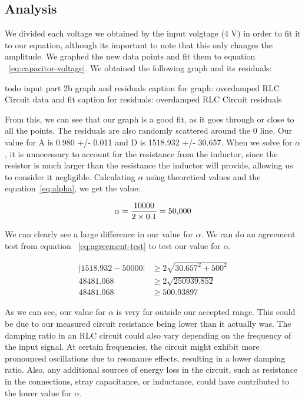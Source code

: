 \documentclass[11pt]{article}
\begin{document}
    \subsection{Analysis}\label{subsec:part2b_analysis}
    We divided each voltage we obtained by the input volgtage (4 V) in
    order to fit it to our equation, although its important to note that
    this only changes the amplitude. We graphed the new data points and fit
    them to equation ~\ref{eq:capacitor-voltage}. We obtained the following
    graph and its residuals:

    todo input part 2b graph and residuals
    caption for graph: overdamped RLC Circuit data and fit
    caption for residuals: overdamped RLC Circuit residuals

    From this, we can see that our graph is a good fit, as it goes through or close to all the points. The residuals are also randomly scattered around the 0 line. Our value for A is 0.980 +/- 0.011 and D is 1518.932 +/- 30.657. When we solve for \( \alpha \), it is unnecessary to account for the resistance from the inductor, since the resistor is much larger than the resistance the inductor will provide, allowing us to consider it negligible. Calculating \( \alpha \) using theoretical values and the equation~\ref{eq:alpha}, we get the value:

    \[
        \alpha = \frac{10000}{2 \times 0.1} \\ = 50{,}000
    \]

    We can clearly see a large difference in our value for \( \alpha \). We can do an agreement test from equation ~\ref{eq:agreement-test} to test our value for \( \alpha \).

    \begin{align*}
        |1518.932 - 50000| &\ge 2 \sqrt{30.657^2 + 500^2} \\
        48481.068 &\ge 2 \sqrt{250939.852} \\
        48481.068 &\ge 500.93897
    \end{align*}

    As we can see, our value for \( \alpha \) is very far outside our accepted range. This could be due to our measured circuit resistance being lower than it actually was. The damping ratio in an RLC circuit could also vary depending on the frequency of the input signal. At certain frequencies, the circuit might exhibit more pronounced oscillations due to resonance effects, resulting in a lower damping ratio. Also, any additional sources of energy loss in the circuit, such as resistance in the connections, stray capacitance, or inductance, could have contributed to the lower value for \( \alpha \).
\end{document}
